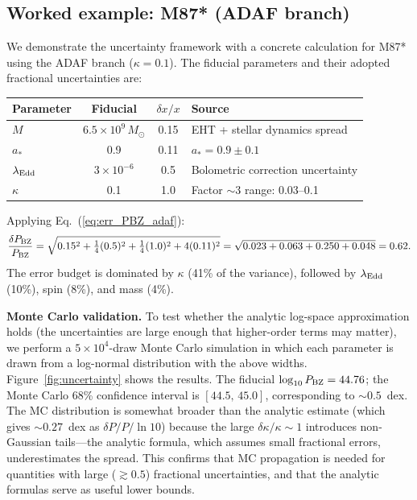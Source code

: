 \documentclass[11pt]{article}
\begin{document}
\subsection{Worked example: M87* (ADAF branch)}\label{sec:worked_uncertainty}

We demonstrate the uncertainty framework with a concrete calculation for M87* using the ADAF branch ($\kappa=0.1$).
The fiducial parameters and their adopted fractional uncertainties are:

\begin{center}
\begin{tabular}{lccl}
\toprule
Parameter & Fiducial & $\delta x/x$ & Source \\
\midrule
$M$ & $6.5\times 10^9\,M_\odot$ & 0.15 & EHT + stellar dynamics spread \\
$a_*$ & 0.9 & 0.11 & $a_*=0.9\pm 0.1$ \\
$\lambda_{\rm Edd}$ & $3\times 10^{-6}$ & 0.5 & Bolometric correction uncertainty \\
$\kappa$ & 0.1 & 1.0 & Factor $\sim 3$ range: 0.03--0.1 \\
\bottomrule
\end{tabular}
\end{center}

Applying Eq.~(\ref{eq:err_PBZ_adaf}):
\begin{equation}
\frac{\delta P_{\rm BZ}}{P_{\rm BZ}} = \sqrt{0.15^2 + \tfrac{1}{4}(0.5)^2 + \tfrac{1}{4}(1.0)^2 + 4(0.11)^2} = \sqrt{0.023+0.063+0.250+0.048} = 0.62.
\end{equation}
The error budget is dominated by $\kappa$ (41\% of the variance), followed by $\lambda_{\rm Edd}$ (10\%), spin (8\%), and mass (4\%).

\textbf{Monte Carlo validation.}
To test whether the analytic log-space approximation holds (the uncertainties are large enough that higher-order terms may matter), we perform a $5\times 10^4$-draw Monte Carlo simulation in which each parameter is drawn from a log-normal distribution with the above widths.
Figure~\ref{fig:uncertainty} shows the results.
The fiducial $\log_{10}P_{\rm BZ}=44.76$; the Monte Carlo 68\% confidence interval is $[44.5,\,45.0]$, corresponding to $\sim 0.5$~dex.
The MC distribution is somewhat broader than the analytic estimate (which gives $\sim 0.27$~dex as $\delta P/P / \ln 10$) because the large $\delta\kappa/\kappa\sim 1$ introduces non-Gaussian tails---the analytic formula, which assumes small fractional errors, underestimates the spread.
This confirms that MC propagation is needed for quantities with large ($\gtrsim 0.5$) fractional uncertainties, and that the analytic formulas serve as useful lower bounds.
\end{document}
